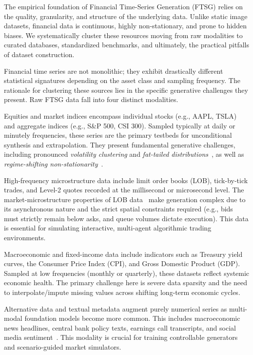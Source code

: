 \documentclass[11pt,a4paper]{article}
\begin{document}
The empirical foundation of Financial Time-Series Generation (FTSG) relies on the quality, granularity, and structure of the underlying data. Unlike static image datasets, financial data is continuous, highly non-stationary, and prone to hidden biases. We systematically cluster these resources moving from raw modalities to curated databases, standardized benchmarks, and ultimately, the practical pitfalls of dataset construction.

Financial time series are not monolithic; they exhibit drastically different statistical signatures depending on the asset class and sampling frequency. The rationale for clustering these sources lies in the specific generative challenges they present. Raw FTSG data fall into four distinct modalities.

Equities and market indices encompass individual stocks (e.g., AAPL, TSLA) and aggregate indices (e.g., S\&P 500, CSI 300). Sampled typically at daily or minutely frequencies, these series are the primary testbeds for unconditional synthesis and extrapolation. They present fundamental generative challenges, including pronounced \textit{volatility clustering} and \textit{fat-tailed distributions}~\citep{cont2001empirical}, as well as \textit{regime-shifting non-stationarity}~\citep{hamilton1989new}.

High-frequency microstructure data include limit order books (LOB), tick-by-tick trades, and Level-2 quotes recorded at the millisecond or microsecond level. The market-microstructure properties of LOB data~\citep{ohara1995market,gould2013limit} make generation complex due to its asynchronous nature and the strict spatial constraints required (e.g., bids must strictly remain below asks, and queue volumes dictate execution). This data is essential for simulating interactive, multi-agent algorithmic trading environments.

Macroeconomic and fixed-income data include indicators such as Treasury yield curves, the Consumer Price Index (CPI), and Gross Domestic Product (GDP). Sampled at low frequencies (monthly or quarterly), these datasets reflect systemic economic health. The primary challenge here is severe data sparsity and the need to interpolate/impute missing values across shifting long-term economic cycles.

Alternative data and textual metadata augment purely numerical series as multi-modal foundation models become more common. This includes macroeconomic news headlines, central bank policy texts, earnings call transcripts, and social media sentiment~\citep{tetlock2007giving,loughran2011liability}. This modality is crucial for training controllable generators and scenario-guided market simulators.
\end{document}
